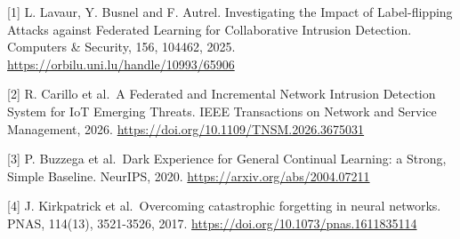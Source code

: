 \documentclass[
  10pt,
]{article}
\begin{document}
{[}1{]} L. Lavaur, Y. Busnel and F. Autrel. Investigating the Impact of
Label-flipping Attacks against Federated Learning for Collaborative
Intrusion Detection. Computers \& Security, 156, 104462, 2025.
\url{https://orbilu.uni.lu/handle/10993/65906}

{[}2{]} R. Carillo et al.~A Federated and Incremental Network Intrusion
Detection System for IoT Emerging Threats. IEEE Transactions on Network
and Service Management, 2026.
\url{https://doi.org/10.1109/TNSM.2026.3675031}

{[}3{]} P. Buzzega et al.~Dark Experience for General Continual
Learning: a Strong, Simple Baseline. NeurIPS, 2020.
\url{https://arxiv.org/abs/2004.07211}

{[}4{]} J. Kirkpatrick et al.~Overcoming catastrophic forgetting in
neural networks. PNAS, 114(13), 3521-3526, 2017.
\url{https://doi.org/10.1073/pnas.1611835114}
\end{document}
